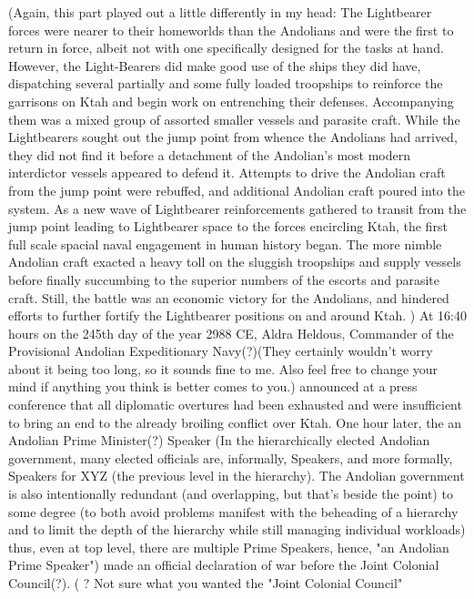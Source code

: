 \begin{itemize}
(Again, this part played out a little differently in my head: The
Lightbearer forces were nearer to their homeworlds than the Andolians
and were the first to return in force, albeit not with one
specifically designed for the tasks at hand. However, the
Light-Bearers did make good use of the ships they did have,
dispatching several partially and some fully loaded troopships to
reinforce the garrisons on Ktah and begin work on entrenching their
defenses. Accompanying them was a mixed group of assorted smaller
vessels and parasite craft. While the Lightbearers sought out the jump
point from whence the Andolians had arrived, they did not find it
before a detachment of the Andolian's most modern interdictor vessels
appeared to defend it. Attempts to drive the Andolian craft from the
jump point were rebuffed, and additional Andolian craft poured into
the system. As a new wave of Lightbearer reinforcements gathered to
transit from the jump point leading to Lightbearer space to the forces
encircling Ktah, the first full scale spacial naval engagement in
human history began. The more nimble Andolian craft exacted a heavy
toll on the sluggish troopships and supply vessels before finally
succumbing to the superior numbers of the escorts and parasite
craft. Still, the battle was an economic victory for the Andolians,
and hindered efforts to further fortify the Lightbearer positions on
and around Ktah.  ) At 16:40 hours on the 245th day of the year 2988
CE, Aldra Heldous, Commander of the Provisional Andolian Expeditionary
Navy(?)(They certainly wouldn't worry about it being too long, so it
sounds fine to me. Also feel free to change your mind if anything you
think is better comes to you.) announced at a press conference that
all diplomatic overtures had been exhausted and were insufficient to
bring an end to the already broiling conflict over Ktah.  One hour
later, the an Andolian Prime Minister(?)  Speaker (In the
hierarchically elected Andolian government, many elected officials
are, informally, Speakers, and more formally, Speakers for XYZ (the
previous level in the hierarchy). The Andolian government is also
intentionally redundant (and overlapping, but that's beside the
point) to some degree (to both avoid problems manifest with the
beheading of a hierarchy and to limit the depth of the hierarchy while
still managing individual workloads) thus, even at top level, there
are multiple Prime Speakers, hence, "an Andolian Prime Speaker")
made an official declaration of war before the Joint Colonial
Council(?). ( ? Not sure what you wanted the "Joint Colonial Council" 

\end{itemize}
